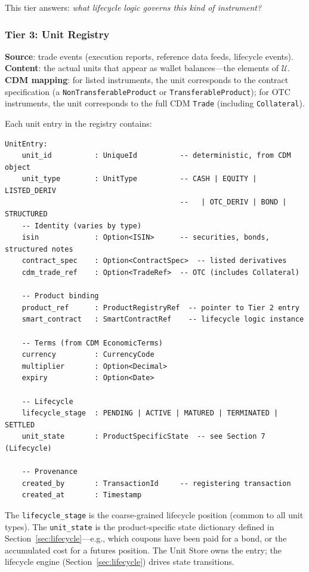 \documentclass[11pt,a4paper]{article}
\begin{document}
This tier answers: \emph{what lifecycle logic governs this kind of instrument?}

\subsubsection{Tier 3: Unit Registry}

\textbf{Source}: trade events (execution reports, reference data feeds, lifecycle events).\\
\textbf{Content}: the actual units that appear as wallet balances---the elements of $\mathcal{U}$.\\
\textbf{CDM mapping}: for listed instruments, the unit corresponds to the contract specification (a \texttt{NonTransferableProduct} or \texttt{TransferableProduct}); for OTC instruments, the unit corresponds to the full CDM \texttt{Trade} (including \texttt{Collateral}).

Each unit entry in the registry contains:

\begin{lstlisting}
UnitEntry:
    unit_id          : UniqueId          -- deterministic, from CDM object
    unit_type        : UnitType          -- CASH | EQUITY | LISTED_DERIV
                                         --   | OTC_DERIV | BOND | STRUCTURED
    -- Identity (varies by type)
    isin             : Option<ISIN>      -- securities, bonds, structured notes
    contract_spec    : Option<ContractSpec>  -- listed derivatives
    cdm_trade_ref    : Option<TradeRef>  -- OTC (includes Collateral)

    -- Product binding
    product_ref      : ProductRegistryRef  -- pointer to Tier 2 entry
    smart_contract   : SmartContractRef    -- lifecycle logic instance

    -- Terms (from CDM EconomicTerms)
    currency         : CurrencyCode
    multiplier       : Option<Decimal>
    expiry           : Option<Date>

    -- Lifecycle
    lifecycle_stage  : PENDING | ACTIVE | MATURED | TERMINATED | SETTLED
    unit_state       : ProductSpecificState  -- see Section 7 (Lifecycle)

    -- Provenance
    created_by       : TransactionId     -- registering transaction
    created_at       : Timestamp
\end{lstlisting}

\noindent The \texttt{lifecycle\_stage} is the coarse-grained lifecycle position (common to all unit types). The \texttt{unit\_state} is the product-specific state dictionary defined in Section~\ref{sec:lifecycle}---e.g., which coupons have been paid for a bond, or the accumulated cost for a futures position. The Unit Store owns the entry; the lifecycle engine (Section~\ref{sec:lifecycle}) drives state transitions.
\end{document}
